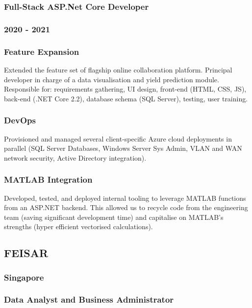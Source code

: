 \documentclass{article}
\begin{document}
\subsubsection{ Full-Stack ASP.Net Core Developer }

\subsubsection{ 2020 - 2021 }

\subsubsection{ Feature Expansion }

Extended the feature set of flagship online collaboration platform. Principal developer in charge of a data visualisation and yield prediction module. Responsible for: requirements gathering, UI design, front-end (HTML, CSS, JS), back-end (.NET Core 2.2), database schema (SQL Server), testing, user training.

\subsubsection{ DevOps }

Provisioned and managed several client-specific Azure cloud deployments in parallel (SQL Server Databases, Windows Server Sys Admin, VLAN and WAN network security, Active Directory integration).

\subsubsection{ MATLAB Integration }

Developed, tested, and deployed internal tooling to leverage MATLAB functions from an ASP.NET backend. This allowed us to recycle code from the engineering team (saving significant development time) and capitalise on MATLAB’s strengths (hyper efficient vectorised calculations).

\subsection{ FEISAR }

\subsubsection{ Singapore }

\subsubsection{ Data Analyst and Business Administrator }
\end{document}
